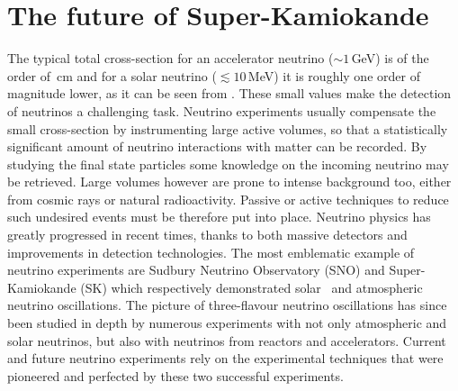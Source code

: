 \chapter{The future of Super-Kamiokande}
\label{cha:skgd}

The typical total cross-section for an accelerator neutrino \mbox{($\sim1$\,GeV)} %
is of the order of \,cm and for a solar neutrino ($\lesssim10$\,MeV) %
it is roughly one order of magnitude lower, as it can be seen from .
These small values make the detection of neutrinos a challenging task.
Neutrino experiments usually compensate the small cross-section by instrumenting large active volumes, %
so that a statistically significant amount of neutrino interactions with matter can be recorded.
By studying the final state particles some knowledge on the incoming neutrino may be retrieved.
Large volumes however are prone to intense background too, either from cosmic rays or natural radioactivity.
Passive or active techniques to reduce such undesired events must be therefore put into place.
Neutrino physics has greatly progressed in recent times, thanks to both massive detectors and %
improvements in detection technologies.
The most emblematic example of neutrino experiments are Sudbury Neutrino Observatory (SNO) and Super-Kamiokande (SK) %
which respectively demonstrated solar~\cite{Aharmim:2005gt} and atmospheric~\cite{Fukuda:1998mi} neutrino oscillations.
The picture of three-flavour neutrino oscillations has since been studied in depth %
by numerous experiments with not only atmospheric and solar neutrinos, but also with neutrinos from reactors and accelerators.
Current and future neutrino experiments rely on the experimental techniques that were pioneered and perfected %
by these two successful experiments.

